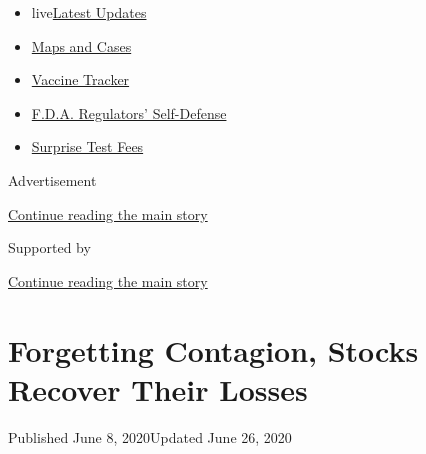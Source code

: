 \begin{itemize}
\tightlist
\item
  live\href{https://www.nytimes3xbfgragh.onion/2020/09/12/world/covid-19-coronavirus.html?name=styln-coronavirus-markets\&region=TOP_BANNER\&block=storyline_menu_recirc\&action=click\&pgtype=Article\&impression_id=90445700-f52e-11ea-a263-739fdfaf6370\&variant=undefined}{Latest
  Updates}
\item
  \href{https://www.nytimes3xbfgragh.onion/interactive/2020/us/coronavirus-us-cases.html?name=styln-coronavirus-markets\&region=TOP_BANNER\&block=storyline_menu_recirc\&action=click\&pgtype=Article\&impression_id=90445701-f52e-11ea-a263-739fdfaf6370\&variant=undefined}{Maps
  and Cases}
\item
  \href{https://www.nytimes3xbfgragh.onion/interactive/2020/science/coronavirus-vaccine-tracker.html?name=styln-coronavirus-markets\&region=TOP_BANNER\&block=storyline_menu_recirc\&action=click\&pgtype=Article\&impression_id=90445702-f52e-11ea-a263-739fdfaf6370\&variant=undefined}{Vaccine
  Tracker}
\item
  \href{https://www.nytimes3xbfgragh.onion/2020/09/10/us/politics/fda-coronavirus-vaccine.html?name=styln-coronavirus-markets\&region=TOP_BANNER\&block=storyline_menu_recirc\&action=click\&pgtype=Article\&impression_id=90445703-f52e-11ea-a263-739fdfaf6370\&variant=undefined}{F.D.A.
  Regulators' Self-Defense}
\item
  \href{https://www.nytimes3xbfgragh.onion/2020/09/09/upshot/coronavirus-surprise-test-fees.html?name=styln-coronavirus-markets\&region=TOP_BANNER\&block=storyline_menu_recirc\&action=click\&pgtype=Article\&impression_id=90447e10-f52e-11ea-a263-739fdfaf6370\&variant=undefined}{Surprise
  Test Fees}
\end{itemize}

Advertisement

\protect\hyperlink{after-top}{Continue reading the main story}

Supported by

\protect\hyperlink{after-sponsor}{Continue reading the main story}

\hypertarget{forgetting-contagion-stocks-recover-their-losses}{%
\section{Forgetting Contagion, Stocks Recover Their
Losses}\label{forgetting-contagion-stocks-recover-their-losses}}

Published June 8, 2020Updated June 26, 2020

